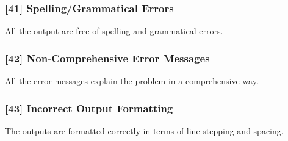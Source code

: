 \subsubsection{[41] Spelling/Grammatical Errors}
All the output are free of spelling and grammatical errors.

\subsubsection{[42] Non-Comprehensive Error Messages}
All the error messages explain the problem in a comprehensive way. 

\subsubsection{[43] Incorrect Output Formatting}
The outputs are formatted correctly in terms of line stepping and spacing.
